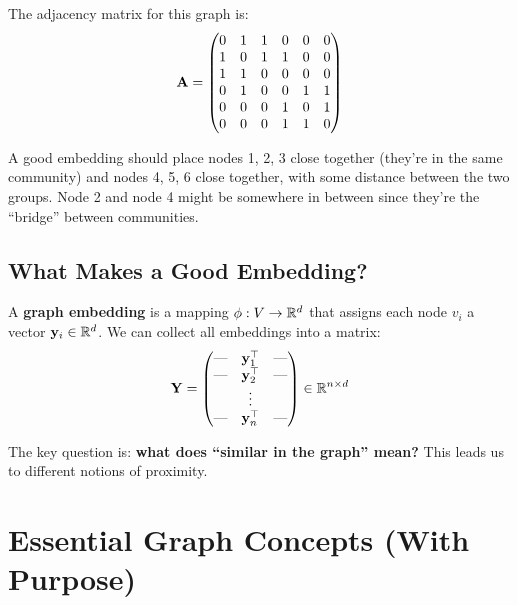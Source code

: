 \begin{notechapter}
The adjacency matrix for this graph is:
\begin{equation}
\mathbf{A} = \begin{pmatrix}
0 & 1 & 1 & 0 & 0 & 0 \\
1 & 0 & 1 & 1 & 0 & 0 \\
1 & 1 & 0 & 0 & 0 & 0 \\
0 & 1 & 0 & 0 & 1 & 1 \\
0 & 0 & 0 & 1 & 0 & 1 \\
0 & 0 & 0 & 1 & 1 & 0
\end{pmatrix}
\label{shallow-embeddings:eq:adj_matrix}
\end{equation}

\begin{intuition}
A good embedding should place nodes 1, 2, 3 close together (they're in the same community) and nodes 4, 5, 6 close together, with some distance between the two groups. Node 2 and node 4 might be somewhere in between since they're the ``bridge'' between communities.
\end{intuition}

\subsection{What Makes a Good Embedding?}

\begin{definition}
A \textbf{graph embedding} is a mapping $\phi: V \to \mathbb{R}^d$ that assigns each node $v_i$ a vector $\mathbf{y}_i \in \mathbb{R}^d$. We can collect all embeddings into a matrix:
\[
\mathbf{Y} = \begin{pmatrix} \text{---} & \mathbf{y}_1^\top & \text{---} \\ \text{---} & \mathbf{y}_2^\top & \text{---} \\ & \vdots & \\ \text{---} & \mathbf{y}_n^\top & \text{---} \end{pmatrix} \in \mathbb{R}^{n \times d}
\]
\end{definition}

The key question is: \textbf{what does ``similar in the graph'' mean?} This leads us to different notions of proximity.

\section{Essential Graph Concepts (With Purpose)}


\end{notechapter}
